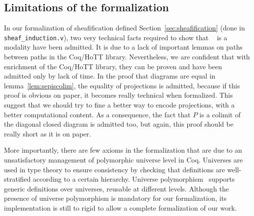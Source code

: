 \documentclass[conference]{IEEEtran}
\DeclareMathOperator{\IsHProp}{IsHProp}
\DeclareMathOperator{\id}{id}
\newcommand \separated {\mathop{\square_{n+1}} }
\begin{document}

\subsection{Limitations of the formalization}

In our formalization of sheafification defined
Section~\ref{sec:sheafification} (done in 
\texttt{sheaf\_induction.v}), two very technical facts required to
show that $\separated$ is a modality have been
admitted. 
%
It is due to a lack of important lemmas on paths between paths in
the Coq/HoTT library.
%
Nevertheless, we are confident that with enrichment of the Coq/HoTT
library, they can be proven and have been admitted only by lack of
time.
%
In the proof that diagrams are equal in lemma~\ref{lem:sepiscolim},
the equality of projections is admitted, because if this proof is
obvious on paper, it becomes really technical when formalized.
%
This suggest that we should try to fine a better way to encode
projections, with a better computational content.
%
As a consequence, the fact that $P$ is a colimit of the diagonal
closed diagram is admitted too, but again, this proof should be really
short as it is on paper.

More importantly, there are few axioms in the formalization that are
due to an unsatisfactory management of polymorphic universe level in
Coq.
%
Universes are used in type theory to ensure consistency by checking
that definitions are well-stratified according to a certain hierarchy.
%
Universe polymorphism~\cite{sozeau2014universe} supports generic
definitions over universes, reusable at different levels.
%
Although the presence of universe polymorphism is mandatory for our
formalization, its implementation is still to rigid to allow a
complete formalization of our work.
\end{document}
